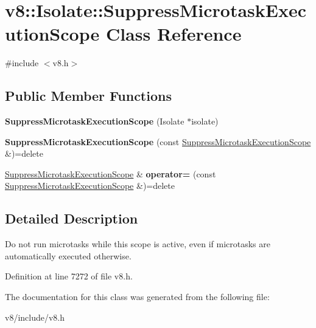\hypertarget{classv8_1_1Isolate_1_1SuppressMicrotaskExecutionScope}{}\section{v8\+:\+:Isolate\+:\+:Suppress\+Microtask\+Execution\+Scope Class Reference}
\label{classv8_1_1Isolate_1_1SuppressMicrotaskExecutionScope}


{\ttfamily \#include $<$v8.\+h$>$}

\subsection*{Public Member Functions}
\begin{DoxyCompactItemize}
\item 
\mbox{\label{classv8_1_1Isolate_1_1SuppressMicrotaskExecutionScope_a846d7dd39f4cfad4dfc4c8c785e4a65e}} 
{\bfseries Suppress\+Microtask\+Execution\+Scope} (Isolate $\ast$isolate)
\item 
\mbox{\label{classv8_1_1Isolate_1_1SuppressMicrotaskExecutionScope_ae4d7f51ceab47cabf1f78f65224ca95d}} 
{\bfseries Suppress\+Microtask\+Execution\+Scope} (const \mbox{\hyperlink{classv8_1_1Isolate_1_1SuppressMicrotaskExecutionScope}{Suppress\+Microtask\+Execution\+Scope}} \&)=delete
\item 
\mbox{\label{classv8_1_1Isolate_1_1SuppressMicrotaskExecutionScope_a48038b7c5037f6a329c27ccffef0e71c}} 
\mbox{\hyperlink{classv8_1_1Isolate_1_1SuppressMicrotaskExecutionScope}{Suppress\+Microtask\+Execution\+Scope}} \& {\bfseries operator=} (const \mbox{\hyperlink{classv8_1_1Isolate_1_1SuppressMicrotaskExecutionScope}{Suppress\+Microtask\+Execution\+Scope}} \&)=delete
\end{DoxyCompactItemize}


\subsection{Detailed Description}
Do not run microtasks while this scope is active, even if microtasks are automatically executed otherwise. 

Definition at line 7272 of file v8.\+h.



The documentation for this class was generated from the following file\+:\begin{DoxyCompactItemize}
\item 
v8/include/v8.\+h\end{DoxyCompactItemize}

